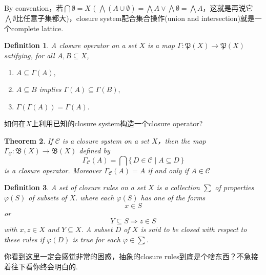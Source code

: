 \documentclass{article}
\newtheorem{theorem}{Theorem}[section]
\newtheorem{definition}[theorem]{Definition}
\newcommand*{\xfunc}[4]{{#2}\colon{#3}{#1}{#4}}
\newcommand*{\func}[3]{\xfunc{\to}{#1}{#2}{#3}}
\newcommand\Set[2]{\{\,#1\mid#2\,\}} %
\begin{document}
{\color{red} By convention，若$\bigcap \emptyset = X$ ( $\bigwedge (A\cup\emptyset) = \bigwedge A \vee \bigwedge \emptyset = \bigwedge A$，这就是再说它$\bigwedge \emptyset$比任意子集都大)，closure system配合集合操作(union and intersection)就是一个complete lattice}.


\begin{definition}
\rm A {\color{red} closure} operator on a set $X$ is a map $\func{\Gamma}{\mathfrak{P}(X)}{\mathfrak{P}(X)}$ satifying, for all $A,B \subseteq X$,
\begin{enumerate}
	\item $A \subseteq \Gamma(A),$
	\item $A \subseteq B$ implies $\Gamma(A) \subseteq \Gamma(B),$
	\item $\Gamma(\Gamma(A)) = \Gamma(A).$
\end{enumerate}
\end{definition}


{\color{red} 如何在$X$上利用已知的closure system构造一个closure operator}?

\begin{theorem}
\rm If $\mathcal{C}$ is a closure system on a set $X$，then the map $\func{\Gamma_{\mathcal{C}}}{\mathfrak{B}(X)}{\mathfrak{B}(X)}$ defined by 
$$
\Gamma_{\mathcal{C}}(A) = \bigcap \Set{D \in \mathcal{C}}{A \subseteq D}
$$
is a closure operator. Moreover $\Gamma_{\mathcal{C}}(A)=A$ if and only if $A \in \mathcal{C}$
\end{theorem}


\begin{definition}
\rm A set of {\color{red} closure rules} on a set $X$ is a collection $\sum$ of properties $\varphi(S)$ of subsets of $X$. where each $\varphi(S)$ has one of the forms
$$
x \in S
$$
or 
$$ 
Y \subseteq S \Rightarrow z \in S
$$ 
with $x,z \in X$ and $Y \subseteq X$. A subset $D$ of $X$ is said to be closed with respect to these rules if $\varphi(D)$ is true for each $\varphi \in \sum$.
\end{definition}

{\color{blue} 你看到这里一定会感觉非常的困惑，抽象的closure rules到底是个啥东西？不急接着往下看你终会明白的}.
\end{document}
